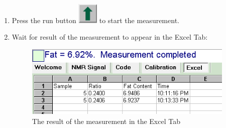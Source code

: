 \documentclass[a4paper,12pt]{article}
\begin{document}
\begin{enumerate}[ref={observation~\arabic*}]
\item Press the run button \includegraphics[height=1cm]{Btn_Start.jpg} to start the measurement.

\item Wait for result of the measurement to appear in the Excel Tab:

\begin{figure}[H]
\centering
\includegraphics[width=10cm]{Measurement_Cookie_Fat.png}
\caption{The result of the measurement in the Excel Tab}
\label{fig:Measurement_Completed}
\end{figure}

\end{enumerate}
\end{document}

